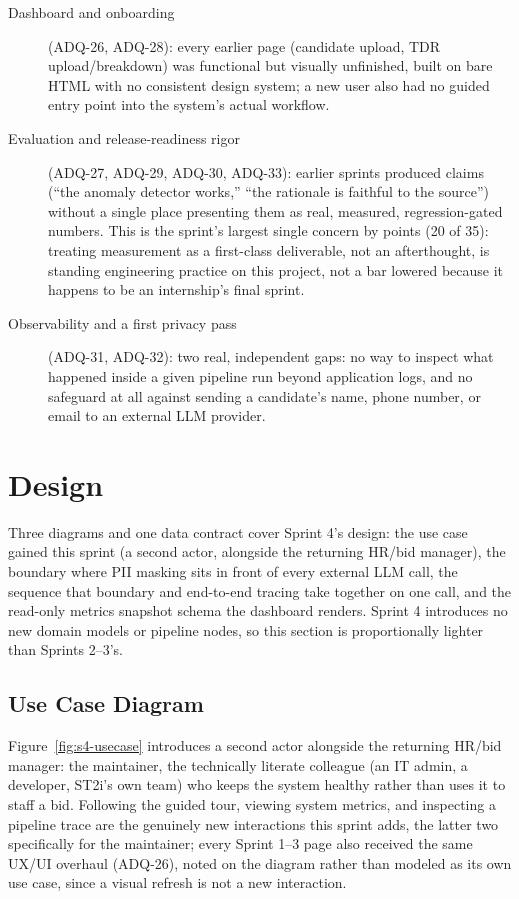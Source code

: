 \begin{description}
  \item[Dashboard and onboarding] (ADQ-26, ADQ-28): every earlier page
    (candidate upload, TDR upload/breakdown) was functional but visually
    unfinished, built on bare HTML with no consistent design system; a
    new user also had no guided entry point into the system's actual
    workflow.
  \item[Evaluation and release-readiness rigor] (ADQ-27, ADQ-29, ADQ-30,
    ADQ-33): earlier sprints produced claims (``the anomaly detector
    works,'' ``the rationale is faithful to the source'') without a
    single place presenting them as real, measured, regression-gated
    numbers. This is the sprint's largest single concern by points (20 of
    35): treating measurement as a first-class deliverable, not an
    afterthought, is standing engineering practice on this project, not
    a bar lowered because it happens to be an internship's final sprint.
  \item[Observability and a first privacy pass] (ADQ-31, ADQ-32): two
    real, independent gaps: no way to inspect what happened inside a
    given pipeline run beyond application logs, and no safeguard at all
    against sending a candidate's name, phone number, or email to an
    external LLM provider.
\end{description}

\section{Design}

Three diagrams and one data contract cover Sprint 4's design: the use
case gained this sprint (a second actor, alongside the returning
HR/bid manager), the boundary where PII masking sits in front of every
external LLM call, the sequence that boundary and end-to-end tracing
take together on one call, and the read-only metrics snapshot schema the
dashboard renders. Sprint 4 introduces no new domain models or pipeline
nodes, so this section is proportionally lighter than Sprints 2--3's.

\subsection{Use Case Diagram}
\label{sec:s4-usecase}

Figure~\ref{fig:s4-usecase} introduces a second actor alongside the
returning HR/bid manager: the maintainer, the technically literate
colleague (an IT admin, a developer, ST2i's own team) who keeps the
system healthy rather than uses it to staff a bid. Following the guided
tour, viewing system metrics, and inspecting a pipeline trace are the
genuinely new interactions this sprint adds, the latter two specifically
for the maintainer; every Sprint 1--3 page also received the same UX/UI
overhaul (ADQ-26), noted on the diagram rather than modeled as its own
use case, since a visual refresh is not a new interaction.


